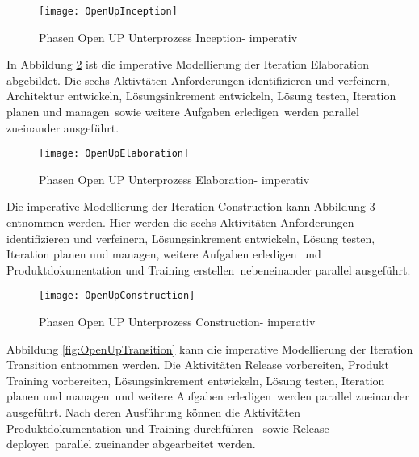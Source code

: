 \begin{figure}[htp]
\begin{center}
  \texttt{[image: OpenUpInception]} %
  \caption{Phasen Open UP Unterprozess Inception- imperativ}
  \label{fig:OpenUpInception}
\end{center}
\end{figure}

In Abbildung \ref{fig:OpenUpElaboration} ist die imperative Modellierung der Iteration Elaboration abgebildet. Die sechs Aktivtäten \grqq Anforderungen identifizieren und verfeinern\grqq , \grqq Architektur entwickeln\grqq, \grqq Lösungsinkrement entwickeln\grqq, \grqq Lösung testen\grqq, \grqq Iteration planen und managen\grqq \ sowie \grqq weitere Aufgaben erledigen\grqq \ werden parallel zueinander ausgeführt.

\begin{figure}[htp]
\begin{center}
  \texttt{[image: OpenUpElaboration]} %
  \caption{Phasen Open UP Unterprozess Elaboration- imperativ}
  \label{fig:OpenUpElaboration}
\end{center}
\end{figure}

Die imperative Modellierung der Iteration Construction kann Abbildung \ref{fig:OpenUpConstruction} entnommen werden. Hier werden die sechs Aktivitäten \grqq Anforderungen identifizieren und verfeinern\grqq, \grqq Lösungsinkrement entwickeln\grqq , \grqq Lösung testen\grqq , \grqq Iteration planen und managen\grqq , \grqq weitere Aufgaben erledigen\grqq  \ und \grqq Produktdokumentation und Training erstellen\grqq \ nebeneinander parallel ausgeführt.
\begin{figure}[htp]
\begin{center}
  \texttt{[image: OpenUpConstruction]} %
  \caption{Phasen Open UP Unterprozess Construction- imperativ}
  \label{fig:OpenUpConstruction}
\end{center}
\end{figure}

Abbildung \ref{fig:OpenUpTransition} kann die imperative Modellierung der Iteration Transition entnommen werden. Die Aktivitäten \grqq Release vorbereiten\grqq, \grqq  Produkt Training vorbereiten\grqq, \grqq Lösungsinkrement entwickeln\grqq, \grqq Lösung testen\grqq , \grqq Iteration planen und managen\grqq \ und \grqq weitere Aufgaben erledigen\grqq \ werden parallel zueinander ausgeführt. Nach deren Ausführung können die Aktivitäten Produktdokumentation und Training durchführen \grqq \ sowie \grqq Release deployen\grqq \  parallel zueinander abgearbeitet werden.

